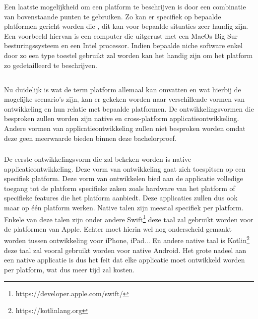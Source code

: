 \begin{itemize}
Een laatste mogelijkheid om een platform te beschrijven is door een combinatie van bovenstaande punten te gebruiken. Zo kan er specifiek op bepaalde platformen gericht worden die , dit kan voor bepaalde situaties zeer handig zijn. Een voorbeeld hiervan is een computer die uitgerust met een MacOs Big Sur besturingssysteem en een Intel processor. Indien bepaalde niche software enkel door zo een type toestel gebruikt zal worden kan het handig zijn om het platform zo gedetailleerd te beschrijven.
\end{itemize}

\subsection{}
\label{sec:SVZontwikkelingsvormen}

Nu duidelijk is wat de term platform allemaal kan omvatten en wat hierbij de mogelijke scenario's zijn, kan er gekeken worden naar verschillende vormen van ontwikkeling en hun relatie met bepaalde platformen. De ontwikkelingsvormen die besproken zullen worden zijn native en cross-platform applicatieontwikkeling. Andere vormen van applicatieontwikkeling zullen niet besproken worden omdat deze geen meerwaarde bieden binnen deze bachelorproef.

\subsubsection{}
\label{sec:SVZnative}
De eerste ontwikkelingsvorm die zal bekeken worden is native applicatieontwikkeling. Deze vorm van ontwikkeling gaat zich toespitsen op een specifiek platform. Deze vorm van ontwikkelen bied aan de applicatie volledige toegang tot de platform specifieke zaken zoals hardware van het platform of specifieke features die het platform aanbiedt.\autocite{RahulRaj2012} Deze applicaties zullen dus ook maar op één platform werken. Native talen zijn meestal specifiek per platform. Enkele van deze talen zijn onder andere Swift\footnote{https://developer.apple.com/swift/} deze taal zal gebruikt worden voor de platformen van Apple. Echter moet hierin wel nog onderscheid gemaakt worden tussen ontwikkeling voor iPhone, iPad... En andere native taal is Kotlin\footnote{https://kotlinlang.org} deze taal zal vooral gebruikt worden voor native Android. 
Het grote nadeel aan een native applicatie is dus het feit dat elke applicatie moet ontwikkeld worden per platform, wat dus meer tijd zal kosten.

